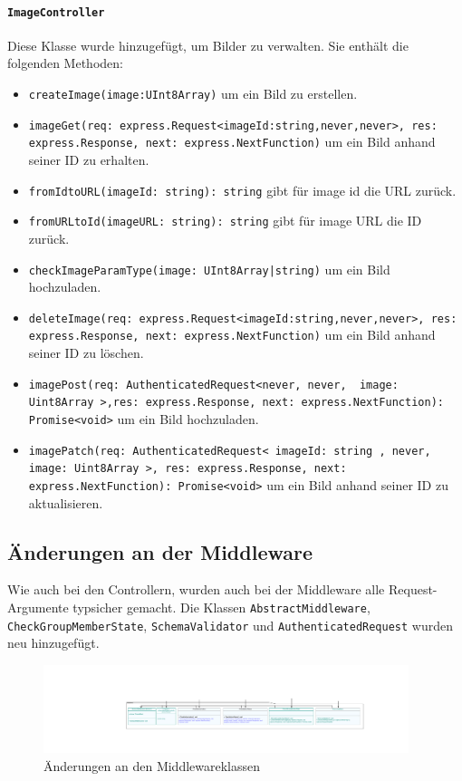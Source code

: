 \documentclass{implementierungsheft}
\begin{document}
\paragraph{\texttt{ImageController}} Diese Klasse wurde hinzugefügt, um Bilder zu verwalten. Sie enthält die folgenden Methoden: 
\begin{itemize}
    \item \texttt{createImage(image:UInt8Array)} um ein Bild zu erstellen.
    \item \texttt{imageGet(req: express.Request<{imageId:string},never,never>, res: express.Response, next: express.NextFunction)} um ein Bild anhand seiner ID zu erhalten.
    \item \texttt{fromIdtoURL(imageId: string): string} gibt für image id die URL zurück.
    \item \texttt{fromURLtoId(imageURL: string): string} gibt für image URL die ID zurück.
    \item \texttt{checkImageParamType(image: UInt8Array|string)} um ein Bild hochzuladen.
    \item \texttt{deleteImage(req: express.Request<{imageId:string},never,never>, res: express.Response, next: express.NextFunction)} um ein Bild anhand seiner ID zu löschen.
    \item \texttt{imagePost(req: AuthenticatedRequest<never, never, { image: Uint8Array }>,res: express.Response, next: express.NextFunction): Promise<void>} um ein Bild hochzuladen.
    \item \texttt{imagePatch(req: AuthenticatedRequest<{ imageId: string }, never, { image: Uint8Array }>, res: express.Response, next: express.NextFunction): Promise<void>} um ein Bild anhand seiner ID zu aktualisieren.
\end{itemize}

\subsection{Änderungen an der Middleware} Wie auch bei den Controllern, wurden auch bei der Middleware alle Request-Argumente typsicher gemacht. Die Klassen \texttt{AbstractMiddleware}, \texttt{CheckGroupMemberState}, \texttt{SchemaValidator} und \texttt{AuthenticatedRequest} wurden neu hinzugefügt.


\begin{figure}[htp]
    \centering
    \includegraphics[width=0.95\textwidth]{images/uml/middleware.pdf}
    \caption{Änderungen an den Middlewareklassen}
    \label{fig:middleware}
\end{figure}
\end{document}
